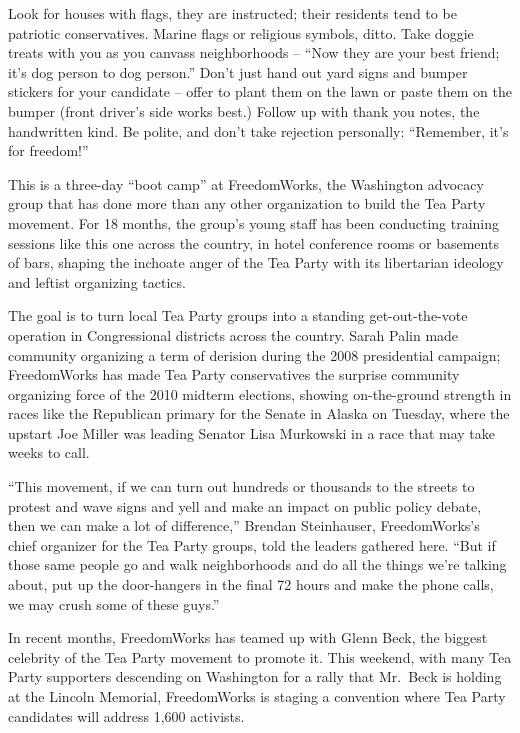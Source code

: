 ﻿\documentclass[12pt]{article}
\begin{document}
Look for houses with flags, they are instructed; their residents tend to be patriotic conservatives.
Marine flags or religious symbols, ditto. Take doggie treats with you as you canvass neighborhoods
-- ``Now they are your best friend; it's dog person to dog person.'' Don't just hand out yard signs
and bumper stickers for your candidate -- offer to plant them on the lawn or paste them on the
bumper (front driver's side works best.) Follow up with thank you notes, the handwritten kind. Be
polite, and don't take rejection personally: ``Remember, it's for freedom!''

This is a three-day ``boot camp'' at FreedomWorks, the Washington advocacy group that has done more
than any other organization to build the Tea Party movement. For 18 months, the group's young staff
has been conducting training sessions like this one across the country, in hotel conference rooms or
basements of bars, shaping the inchoate anger of the Tea Party with its libertarian ideology and
leftist organizing tactics.

The goal is to turn local Tea Party groups into a standing get-out-the-vote operation in
Congressional districts across the country. Sarah Palin made community organizing a term of derision
during the 2008 presidential campaign; FreedomWorks has made Tea Party conservatives the surprise
community organizing force of the 2010 midterm elections, showing on-the-ground strength in races
like the Republican primary for the Senate in Alaska on Tuesday, where the upstart Joe Miller was
leading Senator Lisa Murkowski in a race that may take weeks to call.

``This movement, if we can turn out hundreds or thousands to the streets to protest and wave signs
and yell and make an impact on public policy debate, then we can make a lot of difference,'' Brendan
Steinhauser, FreedomWorks's chief organizer for the Tea Party groups, told the leaders gathered
here. ``But if those same people go and walk neighborhoods and do all the things we're talking
about, put up the door-hangers in the final 72 hours and make the phone calls, we may crush some of
these guys.''

In recent months, FreedomWorks has teamed up with Glenn Beck, the biggest celebrity of the Tea Party
movement to promote it. This weekend, with many Tea Party supporters descending on Washington for a
rally that Mr.~Beck is holding at the Lincoln Memorial, FreedomWorks is staging a convention where
Tea Party candidates will address 1,600 activists.
\end{document}
